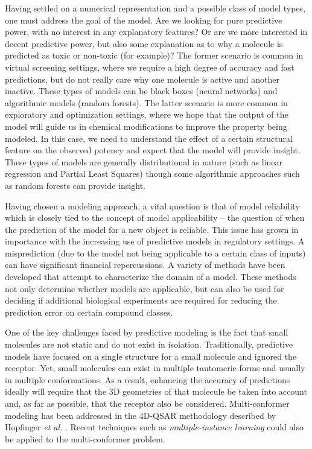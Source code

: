 \documentclass{sig-alternate}
\begin{document}
Having settled on a numerical representation and a possible class of
model types, one must address the goal of the model. Are we
looking for pure predictive power, with no interest in any explanatory
features? Or are we more interested in decent predictive power, but
also some explanation as to why a molecule is predicted as toxic or
non-toxic (for example)? The former scenario is common in virtual
screening settings, where we require a high degree of accuracy and fast
predictions, but do not really care why one molecule is active
and another inactive. These types of models can be black boxes (neural
networks) and algorithmic models \cite{Breiman:2001fk} (random
forests). The latter scenario is more common in exploratory and
optimization settings, where we hope that the output of the model will
guide us in chemical modifications to improve the property being
modeled.  In this case, we need to understand the effect of a
certain structural feature on the observed potency and expect that the
model will provide insight. These types of models are generally
distributional in nature (such as linear regression and Partial Least Squares) though
some algorithmic approaches such as random forests can provide insight.

Having chosen a modeling approach, a vital question is that of model
reliability which is closely tied to the concept of model
applicability -- the question of when the prediction of the model for
a new object is reliable. This issue has grown in importance with the
increasing use of predictive models in regulatory settings. A
misprediction (due to the model not being applicable to a certain class
of inputs) can have significant financial repercussions. A variety of
methods have been developed that attempt to characterize the domain of
a model. These methods not only determine whether models are
applicable, but can also be used for deciding if additional biological
experiments are required for reducing the prediction error on certain
compound classes.

One of the key challenges faced by predictive modeling is the fact
that small molecules are not static and do not exist in isolation. 
Traditionally, predictive models have focused on a single
structure for a small molecule and ignored the receptor. Yet, small molecules can
exist in multiple tautomeric forms and usually in multiple
conformations. As a result, enhancing the accuracy of predictions
ideally will require that the 3D geometries of that molecule be taken 
into account and, as far as possible, that the receptor also be considered. 
Multi-conformer modeling has been addressed in the
4D-QSAR methodology described by Hopfinger \textit{et al.}
\cite{Albuquerque:1998ys}.  Recent techniques such as
\emph{multiple-instance learning} could also be applied to the
multi-conformer problem.
\end{document}
